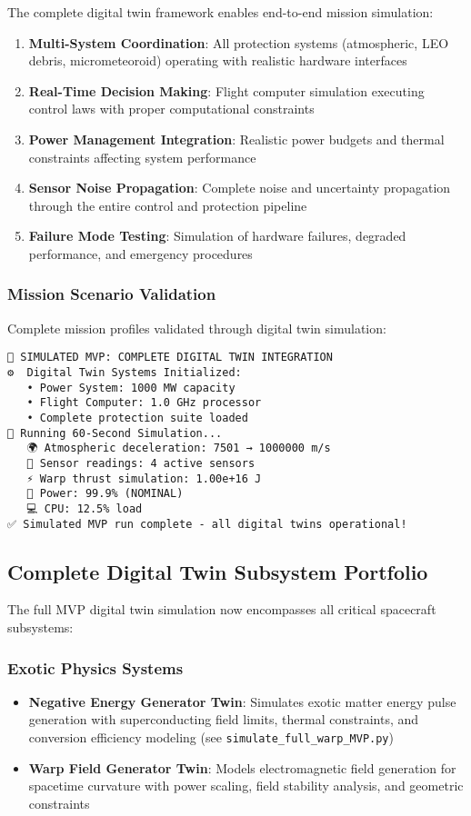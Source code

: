 \documentclass[11pt]{article}
\begin{document}
The complete digital twin framework enables end-to-end mission simulation:
\begin{enumerate}
\item \textbf{Multi-System Coordination}: All protection systems (atmospheric, LEO debris, micrometeoroid) operating with realistic hardware interfaces
\item \textbf{Real-Time Decision Making}: Flight computer simulation executing control laws with proper computational constraints
\item \textbf{Power Management Integration}: Realistic power budgets and thermal constraints affecting system performance
\item \textbf{Sensor Noise Propagation}: Complete noise and uncertainty propagation through the entire control and protection pipeline
\item \textbf{Failure Mode Testing}: Simulation of hardware failures, degraded performance, and emergency procedures
\end{enumerate}

\subsubsection{Mission Scenario Validation}
Complete mission profiles validated through digital twin simulation:
\begin{verbatim}
🚀 SIMULATED MVP: COMPLETE DIGITAL TWIN INTEGRATION
⚙️  Digital Twin Systems Initialized:
   • Power System: 1000 MW capacity
   • Flight Computer: 1.0 GHz processor  
   • Complete protection suite loaded
🔄 Running 60-Second Simulation...
   🌍 Atmospheric deceleration: 7501 → 1000000 m/s
   📡 Sensor readings: 4 active sensors
   ⚡ Warp thrust simulation: 1.00e+16 J
   🔋 Power: 99.9% (NOMINAL)
   💻 CPU: 12.5% load
✅ Simulated MVP run complete - all digital twins operational!
\end{verbatim}

\subsection{Complete Digital Twin Subsystem Portfolio}

The full MVP digital twin simulation now encompasses all critical spacecraft subsystems:

\subsubsection{Exotic Physics Systems}
\begin{itemize}
\item \textbf{Negative Energy Generator Twin}: Simulates exotic matter energy pulse generation with superconducting field limits, thermal constraints, and conversion efficiency modeling (see \texttt{simulate\_full\_warp\_MVP.py})
\item \textbf{Warp Field Generator Twin}: Models electromagnetic field generation for spacetime curvature with power scaling, field stability analysis, and geometric constraints
\end{itemize}
\end{document}
